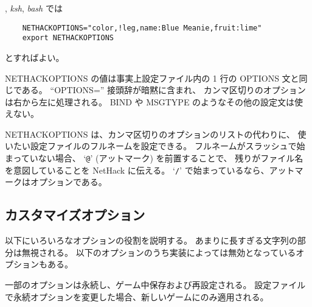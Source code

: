 , {\it ksh}, {\it bash} では
\begin{verbatim}
    NETHACKOPTIONS="color,!leg,name:Blue Meanie,fruit:lime"
    export NETHACKOPTIONS
\end{verbatim}

とすればよい。

NETHACKOPTIONS の値は事実上設定ファイル内の
1 行の OPTIONS 文と同じである。
``OPTIONS='' 接頭辞が暗黙に含まれ、
カンマ区切りのオプションは右から左に処理される。
BIND や MSGTYPE のようなその他の設定文は使えない。

NETHACKOPTIONS は、カンマ区切りのオプションのリストの代わりに、
使いたい設定ファイルのフルネームを設定できる。
フルネームがスラッシュで始まっていない場合、
`{\tt @}' (アットマーク) を前置することで、
残りがファイル名を意図していることを NetHack に伝える。
`{\tt /}' で始まっているなら、アットマークはオプションである。

\subsection*{カスタマイズオプション}

以下にいろいろなオプションの役割を説明する。
あまりに長すぎる文字列の部分は無視される。
以下のオプションのうち実装によっては無効となっているオプションもある。

一部のオプションは永続し、ゲーム中保存および再設定される。
設定ファイルで永続オプションを変更した場合、新しいゲームにのみ適用される。

